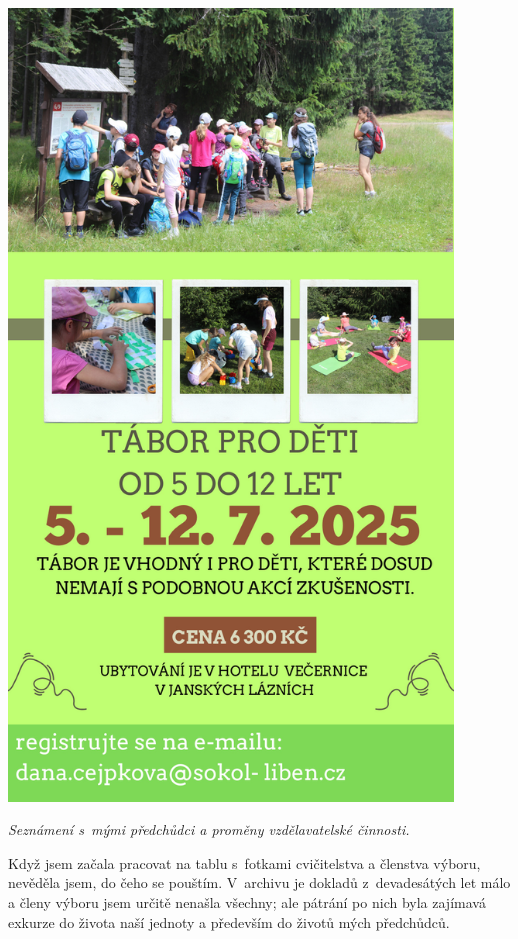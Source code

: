 \documentclass[11pt]{article}
\begin{document}
\pagestyle{blank}
\begin{center}
  \includegraphics[height=21cm]{./letak_tabor_2025.jpg}
\end{center}
\restoregeometry

\clearpage
\pagestyle{standard}


\begin{center}
  \textit{Seznámení s~mými předchůdci a proměny vzdělavatelské činnosti.}
\end{center}
Když jsem začala pracovat na tablu s~fotkami cvičitelstva a členstva výboru, nevěděla jsem, do čeho se pouštím. V~archivu je dokladů z~devadesátých let málo a členy výboru jsem určitě nenašla všechny; ale pátrání po nich byla zajímavá exkurze do života naší jednoty a především do životů mých předchůdců.
\end{document}
